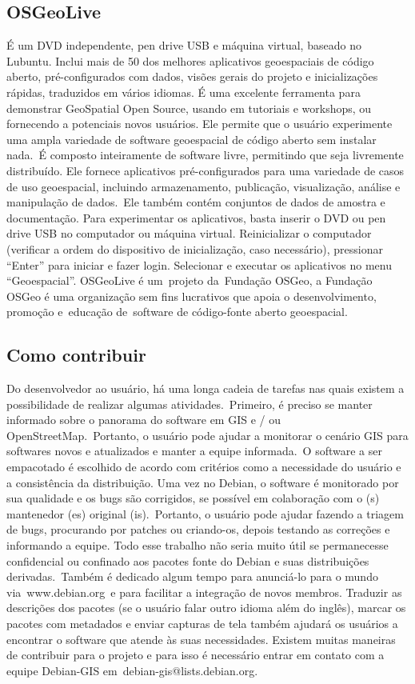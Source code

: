 \subsection{OSGeoLive}

É um DVD independente, pen drive USB e máquina virtual, baseado no Lubuntu. Inclui mais de 50 dos melhores aplicativos geoespaciais de código aberto, pré-configurados com dados, visões gerais do projeto e inicializações rápidas, traduzidos em vários idiomas. É uma excelente ferramenta para demonstrar GeoSpatial Open Source, usando em tutoriais e workshops, ou fornecendo a potenciais novos usuários. Ele permite que o usuário experimente uma ampla variedade de software geoespacial de código aberto sem instalar nada. É composto inteiramente de software livre, permitindo que seja livremente distribuído.  Ele fornece aplicativos pré-configurados para uma variedade de casos de uso geoespacial, incluindo armazenamento, publicação, visualização, análise e manipulação de dados. Ele também contém conjuntos de dados de amostra e documentação.
Para experimentar os aplicativos, basta inserir o DVD ou pen drive USB no computador ou máquina virtual. Reinicializar o computador (verificar a ordem do dispositivo de inicialização, caso necessário), pressionar “Enter” para iniciar e fazer login. Selecionar e executar os aplicativos no menu “Geoespacial”.
OSGeoLive é um projeto da Fundação OSGeo, a Fundação OSGeo é uma organização sem fins lucrativos que apoia o desenvolvimento, promoção e educação de software de código-fonte aberto geoespacial.


\subsection{Como contribuir}

Do desenvolvedor ao usuário, há uma longa cadeia de tarefas nas quais existem a possibilidade de realizar algumas atividades. Primeiro, é preciso se manter informado sobre o panorama do software em GIS e / ou OpenStreetMap. Portanto, o usuário pode ajudar a monitorar o cenário GIS para softwares novos e atualizados e manter a equipe informada. O software a ser empacotado é escolhido de acordo com critérios como a necessidade do usuário e a consistência da distribuição.
Uma vez no Debian, o software é monitorado por sua qualidade e os bugs são corrigidos, se possível em colaboração com o (s) mantenedor (es) original (is). Portanto, o usuário pode ajudar fazendo a triagem de bugs, procurando por patches ou criando-os, depois testando as correções e informando a equipe. Todo esse trabalho não seria muito útil se permanecesse confidencial ou confinado aos pacotes fonte do Debian e suas distribuições derivadas. Também é dedicado algum tempo para anunciá-lo para o mundo via www.debian.org e para facilitar a integração de novos membros. Traduzir as descrições dos pacotes (se o usuário falar outro idioma além do inglês), marcar os pacotes com metadados e enviar capturas de tela também ajudará os usuários a encontrar o software que atende às suas necessidades.
Existem muitas maneiras de contribuir para o projeto e para isso é necessário entrar em contato com a equipe Debian-GIS em debian-gis@lists.debian.org.

